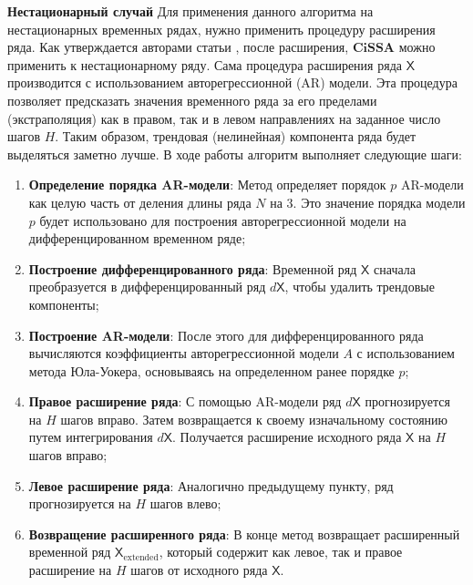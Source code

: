 \documentclass[a4paper, 11pt]{article}
\newcommand{\CISSA}{\textbf{CiSSA}}
\newcommand{\TS}{\mathsf{X}}
\begin{document}
\noindent \textbf{\large{Нестационарный случай}} \newline \newline
Для применения данного алгоритма на нестационарных временных рядах, нужно применить процедуру расширения ряда. Как утверждается авторами статьи \cite{bogalo2020}, после расширения, $\CISSA$ можно применить к нестационарному ряду.
Сама процедура расширения ряда $\TS$ производится с использованием авторегрессионной (AR) модели. Эта процедура позволяет предсказать значения временного ряда за его пределами (экстраполяция) как в правом, так и в левом направлениях на заданное число шагов $H$. Таким образом, трендовая (нелинейная) компонента ряда будет выделяться заметно лучше. В ходе работы алгоритм выполняет следующие шаги:
\begin{enumerate}
	\item \textbf{Определение порядка AR-модели}:
	      Метод определяет порядок $p$ AR-модели как целую часть от деления длины ряда $N$ на 3. Это значение порядка модели $p$ будет использовано для построения авторегрессионной модели на дифференцированном временном ряде;

	\item \textbf{Построение дифференцированного ряда}:
	      Временной ряд $\TS$ сначала преобразуется в дифференцированный ряд $d \TS$, чтобы удалить трендовые компоненты;

	\item \textbf{Построение AR-модели}:
	      После этого для дифференцированного ряда вычисляются коэффициенты авторегрессионной модели $A$ с использованием метода Юла-Уокера, основываясь на определенном ранее порядке $p$;

	\item \textbf{Правое расширение ряда}:
	      С помощью AR-модели ряд $d\TS$ прогнозируется на $H$ шагов вправо. Затем возвращается к своему изначальному состоянию путем интегрирования $d\TS$. Получается расширение исходного ряда $\TS$ на $H$ шагов вправо;

	\item \textbf{Левое расширение ряда}:
	      Аналогично предыдущему пункту, ряд прогнозируется на $H$ шагов влево;

	\item \textbf{Возвращение расширенного ряда}:
	      В конце метод возвращает расширенный временной ряд $\TS_{\mathrm{extended}}$, который содержит как левое, так и правое расширение на $H$ шагов от исходного ряда $\TS$.
\end{enumerate}
\end{document}
